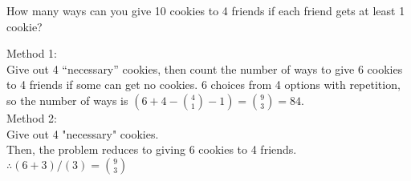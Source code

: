 \question How many ways can you give 10 cookies to 4 friends if each 
friend gets at least 1 cookie?

\begin{solution}[2 cm]
Method 1: \\
Give out 4 “necessary” cookies, then count the number of ways to give 
6 cookies to 4 friends if some can get no cookies. 6 choices from 4 
options with repetition, so the number of ways is  
$(6 + 4 - {4\choose 1} - 1)  =  {9 \choose 3}  = 84.$ \\
\newline
Method 2: \\
Give out 4 "necessary" cookies. \\
Then, the problem reduces to giving 6 cookies to 4 friends. \\
$\therefore (6 + 3) / (3) = {9 \choose 3}$
\end{solution}